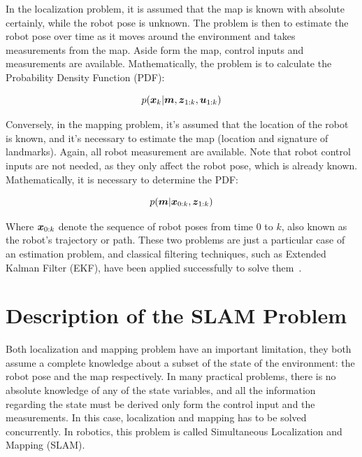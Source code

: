 In the localization problem, it is assumed that the map is known with absolute certainly, while the robot pose is unknown. The problem is then to estimate the robot pose over time as it moves around the environment and takes measurements from the map. Aside form the map, control inputs and measurements are available. Mathematically, the problem is to calculate the Probability Density Function (PDF):

\begin{equation}
p(\boldsymbol{x}_k|\boldsymbol{m},\boldsymbol{z}_{1:k},\boldsymbol{u}_{1:k})
\end{equation}  

Conversely, in the mapping problem, it's assumed that the location of the robot is known, and it's necessary to estimate the map (location and signature of landmarks). Again, all robot measurement are available. Note that robot control inputs are not needed, as they only affect the robot pose, which is already known. Mathematically, it is necessary to determine the PDF:

\begin{equation}
p(\boldsymbol{m}|\boldsymbol{x}_{0:k},\boldsymbol{z}_{1:k})
\end{equation} 

Where $\boldsymbol{x}_{0:k}$ denote the sequence of robot poses from time $0$ to $k$, also known as the robot's trajectory or path. These two problems are just a particular case of an estimation problem, and classical filtering techniques, such as Extended Kalman Filter (EKF), have been applied successfully to solve them~\cite{probabilistic}.  

\section{Description of the SLAM Problem}
\label{sec:slam-description}

Both localization and mapping problem have an important limitation, they both assume a complete knowledge about a subset of the state of the environment: the robot pose and the map respectively. In many practical problems, there is no absolute knowledge of any of the state variables, and all the information regarding the state must be derived only form the control input and the measurements. In this case, localization and mapping has to be solved concurrently. In robotics, this problem is called Simultaneous Localization and Mapping (SLAM). 


